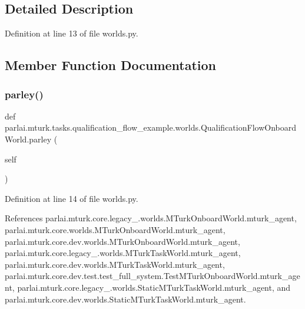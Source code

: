 \subsection{Detailed Description}


Definition at line 13 of file worlds.\+py.



\subsection{Member Function Documentation}
\mbox{\label{classparlai_1_1mturk_1_1tasks_1_1qualification__flow__example_1_1worlds_1_1QualificationFlowOnboardWorld_a45e6a5c9eff2ff559ff50736f521fc50}} 
\subsubsection{\texorpdfstring{parley()}{parley()}}
{\footnotesize\ttfamily def parlai.\+mturk.\+tasks.\+qualification\+\_\+flow\+\_\+example.\+worlds.\+Qualification\+Flow\+Onboard\+World.\+parley (\begin{DoxyParamCaption}\item[{}]{self }\end{DoxyParamCaption})}



Definition at line 14 of file worlds.\+py.



References parlai.\+mturk.\+core.\+legacy\+\_.\+worlds.\+M\+Turk\+Onboard\+World.\+mturk\+\_\+agent, parlai.\+mturk.\+core.\+worlds.\+M\+Turk\+Onboard\+World.\+mturk\+\_\+agent, parlai.\+mturk.\+core.\+dev.\+worlds.\+M\+Turk\+Onboard\+World.\+mturk\+\_\+agent, parlai.\+mturk.\+core.\+legacy\+\_.\+worlds.\+M\+Turk\+Task\+World.\+mturk\+\_\+agent, parlai.\+mturk.\+core.\+dev.\+worlds.\+M\+Turk\+Task\+World.\+mturk\+\_\+agent, parlai.\+mturk.\+core.\+dev.\+test.\+test\+\_\+full\+\_\+system.\+Test\+M\+Turk\+Onboard\+World.\+mturk\+\_\+agent, parlai.\+mturk.\+core.\+legacy\+\_.\+worlds.\+Static\+M\+Turk\+Task\+World.\+mturk\+\_\+agent, and parlai.\+mturk.\+core.\+dev.\+worlds.\+Static\+M\+Turk\+Task\+World.\+mturk\+\_\+agent.



